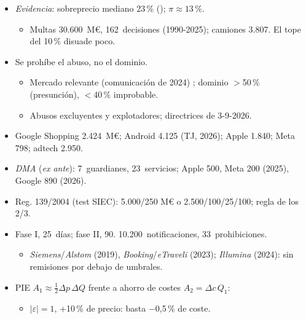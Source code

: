 \documentclass{article}
\begin{document}
\begin{columnas}
\begin{itemize}
\item \emph{Evidencia}: sobreprecio mediano 23\,\% (); $\pi\approx13$\,\%.
  \begin{itemize}
  \item Multas 30.600~M€, 162~decisiones (1990-2025); camiones 3.807. El tope del 10\,\% disuade poco.
  \end{itemize}
\end{itemize}
\begin{itemize}
\item Se prohíbe el abuso, no el dominio.
  \begin{itemize}
  \item Mercado relevante (comunicación de 2024) ; dominio $>$50\,\% (presunción), $<$40\,\% improbable.
  \item Abusos excluyentes y explotadores; directrices de 3-9-2026.
  \end{itemize}
\item Google Shopping 2.424~M€; Android 4.125 (TJ, 2026); Apple 1.840; Meta 798; adtech 2.950.
\item \emph{DMA} (\emph{ex ante}): 7~guardianes, 23~servicios; Apple 500, Meta 200 (2025), Google 890 (2026).
\end{itemize}
\begin{itemize}
\item Reg. 139/2004 (test SIEC): 5.000/250 M€ o 2.500/100/25/100; regla de los 2/3.
\item Fase I, 25~días; fase II, 90. 10.200~notificaciones, 33~prohibiciones.
  \begin{itemize}
  \item \emph{Siemens}/\emph{Alstom} (2019), \emph{Booking}/\emph{eTraveli} (2023); \emph{Illumina} (2024): sin remisiones por debajo de umbrales.
  \end{itemize}
\end{itemize}
\begin{itemize}
\item PIE $A_1\approx\tfrac12\Delta p\,\Delta Q$ frente a ahorro de costes $A_2=\Delta c\,Q_1$:
  \begin{itemize}
  \item $|\varepsilon|=1$, +10\,\% de precio: basta $-$0,5\,\% de coste.

\end{itemize}
\end{itemize}
\end{columnas}
\end{document}
